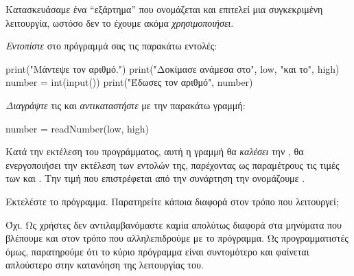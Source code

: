 \documentclass[a4paper,11pt,oneside]{book}
\begin{document}
\begin{step}
Κατασκευάσαμε ένα ``εξάρτημα'' που ονομάζεται  και επιτελεί μια συγκεκριμένη λειτουργία, ωστόσο δεν το έχουμε ακόμα \emph{χρησιμοποιήσει}.

\emph{Εντοπίστε} στο πρόγραμμά σας τις παρακάτω εντολές:

\begin{pyplain}
    print("Μάντεψε τον αριθμό.")
    print("Δοκίμασε ανάμεσα στο", low, "και το", high)
    number = int(input())    
    print("Έδωσες τον αριθμό", number)
\end{pyplain}

\emph{Διαγράψτε} τις και \emph{αντικαταστήστε} με την παρακάτω γραμμή:

\begin{pynew}
    number = readNumber(low, high)
\end{pynew}

Κατά την εκτέλεση του προγράμματος, αυτή η γραμμή θα \emph{καλέσει} την , θα ενεργοποιήσει την εκτέλεση των εντολών της, παρέχοντας ως παραμέτρους τις τιμές των  και . Την τιμή που επιστρέφεται από την συνάρτηση την ονομάζουμε .

Εκτελέστε το πρόγραμμα. Παρατηρείτε κάποια διαφορά στον τρόπο που λειτουργεί;

\begin{answer}
Όχι. Ως χρήστες δεν αντιλαμβανόμαστε καμία απολύτως διαφορά στα μηνύματα που βλέπουμε και στον τρόπο που αλληλεπιδρούμε με το πρόγραμμα. Ως προγραμματιστές όμως, παρατηρούμε ότι το κύριο πρόγραμμα είναι συντομότερο και φαίνεται απλούστερο στην κατανόηση της λειτουργίας του. 
\end{answer}
\end{step}
\end{document}
